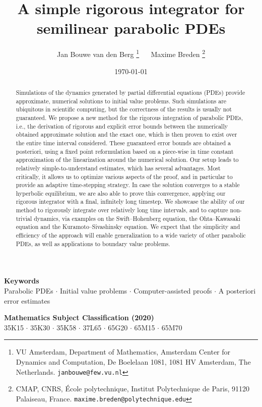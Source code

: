 \documentclass[10pt,a4paper]{article}
\title{A simple rigorous integrator for semilinear parabolic PDEs}
\author{Jan Bouwe van den Berg \thanks{VU Amsterdam, Department of Mathematics, Amsterdam Center for Dynamics and Computation, De Boelelaan 1081, 1081 HV Amsterdam, The Netherlands. \texttt{janbouwe@few.vu.nl}} $\quad$ Maxime Breden \thanks{CMAP, CNRS, \'Ecole polytechnique, Institut Polytechnique de
Paris, 91120 Palaiseau, France. \texttt{maxime.breden@polytechnique.edu}}}
\date{\today}
\theoremstyle{plain}
\newcommand{\1}{\mathbf{1}}
\begin{document}
\maketitle

\begin{abstract} 
Simulations of the dynamics generated by partial differential equations (PDEs) provide approximate, numerical solutions to initial value problems. Such simulations are ubiquitous in scientific computing, but the correctness of the results is usually not guaranteed. We propose a new method for the rigorous integration of parabolic PDEs, i.e., the derivation of rigorous and explicit error bounds between the numerically obtained approximate solution and the exact one, which is then proven to exist over the entire time interval considered. These guaranteed error bounds are obtained a posteriori, using a fixed point reformulation based on a piece-wise in time constant approximation of the linearization around the numerical solution.
Our setup leads to relatively simple-to-understand estimates, which has several advantages. Most critically, it allows us to optimize various aspects of the proof, and in particular to provide an adaptive time-stepping strategy. In case the solution converges to a stable hyperbolic equilibrium, we are also able to prove this convergence, applying our rigorous integrator with a final, infinitely long timestep. We showcase the ability of our method to rigorously integrate over relatively long time intervals, and to capture non-trivial dynamics, via examples on the Swift--Hohenberg equation, the Ohta--Kawasaki equation and the Kuramoto--Sivashinsky equation. We expect that the simplicity and efficiency of the approach will enable generalization to a wide variety of other parabolic PDEs, as well as applications to boundary value problems.
\end{abstract}

\begin{center}
{\bf \small Keywords} \\ \vspace{.05cm}
{ \small Parabolic PDEs $\cdot$ Initial value problems $\cdot$ Computer-assisted proofs $\cdot$ A posteriori error estimates}
\end{center}

\begin{center}
{\bf \small Mathematics Subject Classification (2020)}  \\ \vspace{.05cm}
{\small 35K15 $\cdot$ 35K30 $\cdot$ 35K58 $\cdot$  37L65 $\cdot$ 65G20 $\cdot$ 65M15 $\cdot$ 65M70} 
\end{center}
\end{document}
